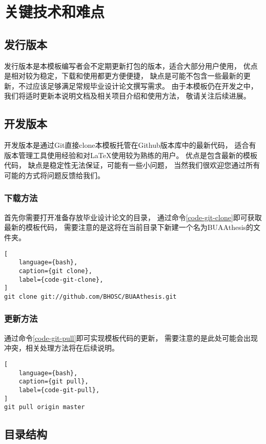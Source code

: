 \chapter{关键技术和难点}

\section{发行版本}

发行版本是本模板编写者会不定期更新打包的版本，适合大部分用户使用，
优点是相对较为稳定，下载和使用都更方便便捷，
缺点是可能不包含一些最新的更新，不过应该足够满足常规毕业设计论文撰写需求。
由于本模板仍在开发之中，我们将适时更新本说明文档及相关项目介绍和使用方法，
敬请关注后续进展。

\section{开发版本}

开发版本是通过Git直接clone本模板托管在Github版本库中的最新代码，
适合有版本管理工具使用经验和对LaTeX使用较为熟练的用户。
优点是包含最新的模板代码，
缺点是稳定性无法保证，可能有一些小问题，
当然我们很欢迎您通过所有可能的方式将问题反馈给我们。

\subsection{下载方法}
首先你需要打开准备存放毕业设计论文的目录，
通过命令\ref{code-git-clone}即可获取最新的模板代码，
需要注意的是这将在当前目录下新建一个名为BUAAthesis的文件夹。
\begin{lstlisting}[
    language={bash},
    caption={git clone},
    label={code-git-clone},
]
git clone git://github.com/BHOSC/BUAAthesis.git
\end{lstlisting}

\subsection{更新方法}
通过命令\ref{code-git-pull}即可实现模板代码的更新，
需要注意的是此处可能会出现冲突，相关处理方法将在后续说明。
\begin{lstlisting}[
    language={bash},
    caption={git pull},
    label={code-git-pull},
]
git pull origin master
\end{lstlisting}

\section{目录结构}

